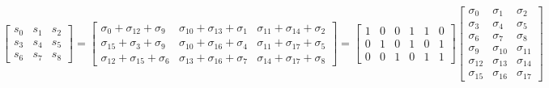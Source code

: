 \documentclass{article}%
\begin{document}
\[%
\left[\begin{matrix}s_{0} & s_{1} & s_{2}\\s_{3} & s_{4} & s_{5}\\s_{6} & s_{7} & s_{8}\end{matrix}\right] = \left[\begin{matrix}\sigma_{0} + \sigma_{12} + \sigma_{9} & \sigma_{10} + \sigma_{13} + \sigma_{1} & \sigma_{11} + \sigma_{14} + \sigma_{2}\\\sigma_{15} + \sigma_{3} + \sigma_{9} & \sigma_{10} + \sigma_{16} + \sigma_{4} & \sigma_{11} + \sigma_{17} + \sigma_{5}\\\sigma_{12} + \sigma_{15} + \sigma_{6} & \sigma_{13} + \sigma_{16} + \sigma_{7} & \sigma_{14} + \sigma_{17} + \sigma_{8}\end{matrix}\right] = \left[\begin{matrix}1 & 0 & 0 & 1 & 1 & 0\\0 & 1 & 0 & 1 & 0 & 1\\0 & 0 & 1 & 0 & 1 & 1\end{matrix}\right] \left[\begin{matrix}\sigma_{0} & \sigma_{1} & \sigma_{2}\\\sigma_{3} & \sigma_{4} & \sigma_{5}\\\sigma_{6} & \sigma_{7} & \sigma_{8}\\\sigma_{9} & \sigma_{10} & \sigma_{11}\\\sigma_{12} & \sigma_{13} & \sigma_{14}\\\sigma_{15} & \sigma_{16} & \sigma_{17}\end{matrix}\right]%
\]%
\end{document}

